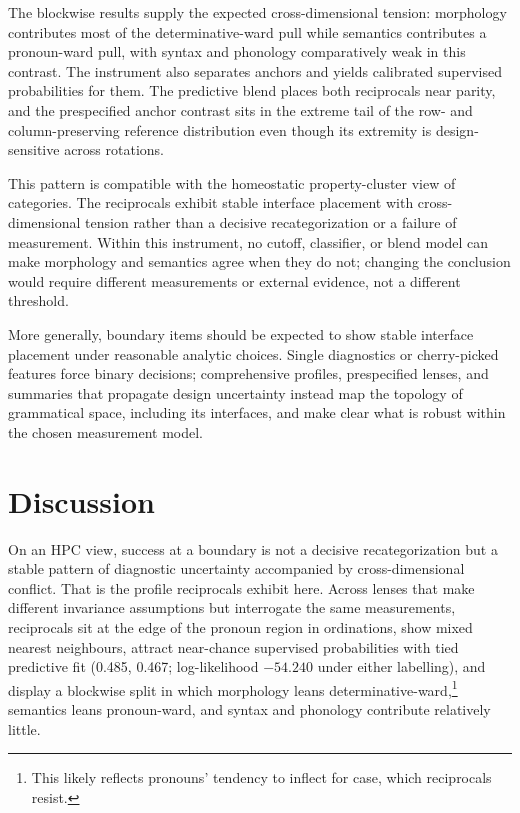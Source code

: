 \documentclass[12pt]{article}
\begin{document}
The blockwise results supply the expected cross-dimensional tension: morphology contributes most of the determinative-ward pull while semantics contributes a pronoun-ward pull, with syntax and phonology comparatively weak in this contrast. The instrument also separates anchors and yields calibrated supervised probabilities for them. The predictive blend places both reciprocals near parity, and the prespecified anchor contrast sits in the extreme tail of the row- and column-preserving reference distribution even though its extremity is design-sensitive across rotations.

This pattern is compatible with the homeostatic property-cluster view of categories. The reciprocals exhibit stable interface placement with cross-dimensional tension rather than a decisive recategorization or a failure of measurement. Within this instrument, no cutoff, classifier, or blend model can make morphology and semantics agree when they do not; changing the conclusion would require different measurements or external evidence, not a different threshold.

More generally, boundary items should be expected to show stable interface placement under reasonable analytic choices. Single diagnostics or cherry-picked features force binary decisions; comprehensive profiles, prespecified lenses, and summaries that propagate design uncertainty instead map the topology of grammatical space, including its interfaces, and make clear what is robust within the chosen measurement model.


\section{Discussion}

On an HPC view, success at a boundary is not a decisive recategorization but a stable pattern of diagnostic uncertainty accompanied by cross-dimensional conflict. That is the profile reciprocals exhibit here. Across lenses that make different invariance assumptions but interrogate the same measurements, reciprocals sit at the edge of the pronoun region in ordinations, show mixed nearest neighbours, attract near-chance supervised probabilities with tied predictive fit (0.485, 0.467; log-likelihood $-54.240$ under either labelling), and display a blockwise split in which morphology leans determinative-ward,\footnote{This likely reflects pronouns' tendency to inflect for case, which reciprocals resist.} semantics leans pronoun-ward, and syntax and phonology contribute relatively little.
\end{document}
